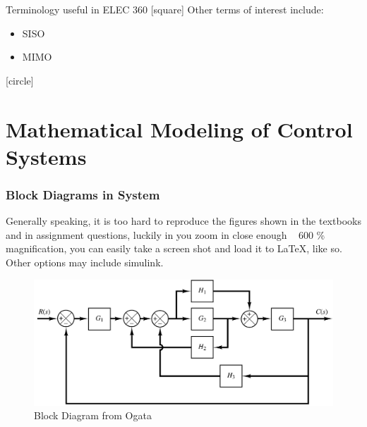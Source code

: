 \documentclass{beamer}
\begin{document}
\begin{frame}[allowframebreaks]{Terminology useful in ELEC 360}
[square]
Other terms of interest include:
 \begin{itemize}
 	\item \gls{SISO}
 	\item \gls{MIMO}
 \end{itemize}

[circle]

\end{frame}

\section{Mathematical Modeling of Control Systems}
\begin{frame}
\frametitle{Block Diagrams in System}
Generally speaking, it is too hard to reproduce the figures shown in the textbooks and in assignment questions, luckily in you zoom in close enough ~ 600 \% magnification, you can easily take a screen shot and load it to \LaTeX, like so. Other options may include simulink.
\begin{figure}
	\includegraphics[width=0.8\linewidth]{Figures/Ch2/Q1}
	\caption{Block Diagram from Ogata \cite[p.60 \textbf{(B-2-3)}]{textbook:ogata}}
\end{figure}
\end{frame}
\end{document}
